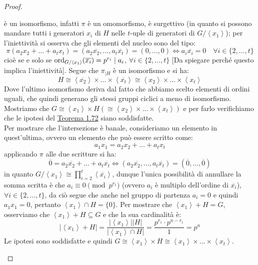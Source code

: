 \documentclass[11pt]{scrartcl}
\begin{document}
\begin{proof}
\begin{itemize}
\[                    \]
            è un isomorfismo, infatti $\pi$ è un omomorfismo, è surgettivo (in quanto si possono mandare tutti i generatori $x_i$ di $H$ nelle $t$-uple di generatori di $G/\left<x_1\right>$); per l'iniettività si osserva che gli elementi del nucleo sono del tipo:
                \[ \pi(a_2x_2 + \ldots + a_tx_t) = (a_2\overline{x_2}, \ldots, a_t\overline{x_t}) = (0,\ldots,0) \iff a_i\overline{x_i} = 0 \quad \forall i \in\{2,\ldots,t\}
                    \]
            cioè se e solo se $\operatorname{ord}_{G/\left<x_1\right>}(\overline{x_i}) = p^{r_i} \mid a_i$, $\forall i \in \{2,\ldots,t\}$ [Da spiegare perché questo implica l'iniettività]. Segue che $\pi_{\mid H}$ è un isomorfismo e si ha:
                \[ H \cong \left<\overline{x_2}\right> \times \ldots \times \left<\overline{x_t}\right> \cong \left<{x_2}\right> \times \ldots \times \left<{x_t}\right>
                    \]
            Dove l'ultimo isomorfismo deriva dal fatto che abbiamo scelto elementi di ordini uguali, che quindi generano gli stessi gruppi ciclici a meno di isomorfismo.
            Mostriamo che $G \cong \left<x_1\right> \times H (\cong \left<x_2\right> \times \ldots \times \left<x_t\right>)$ e per farlo verifichiamo che le ipotesi del \hyperref[t:1.72]{Teorema 1.72} siano soddisfatte. \\
            Per mostrare che l'intersezione è banale, consideriamo un elemento in quest'ultima, ovvero un elemento che può essere scritto come:
                \[ a_1x_1 = a_2x_2 + \ldots + a_tx_t
                    \]
            applicando $\pi$ alle due scritture si ha:
                \[ \overline 0 =  a_2\overline{x_2} + \ldots + a_t\overline{x_t} \iff (a_2\overline{x_2}, \ldots, a_t\overline{x_t}) = (\overline 0,\ldots, \overline 0)
                    \]
            in quanto $G/\left<x_1\right> \cong \prod_{i= 2}^{t}\left<\overline{x_i}\right>$, dunque l'unica possibilità di annullare la somma scritta è che $a_i \equiv 0 \pmod{p^{r_1}}$ (ovvero $a_i$ è multiplo dell'ordine di $\overline{x_i}$), $\forall i \in \{2,\ldots,t\}$, da ciò segue che
            anche nel gruppo di partenza $a_i = 0$ e quindi $a_1x_1 = 0$, pertanto $\left<x_1\right> \cap H = \{0\}$.
            Per mostrare che $\left<x_1\right> + H = G$, osserviamo che $\left<x_1\right> + H \subseteq G$ e che la sua cardinalità è:
                \[ |\left<x_1\right> + H| = \frac{|\left<x_1\right>||H|}{|\left<x_1\right> \cap H|} = \frac{p^{r_1}\cdot p^{n - r_1}}{1} = p^n
                    \]
            Le ipotesi sono soddisfatte e quindi $G \cong \left<x_1\right> \times H \cong \left<x_1\right> \times \ldots \times \left<x_t\right>$.

\end{itemize}
\end{proof}
\end{document}

